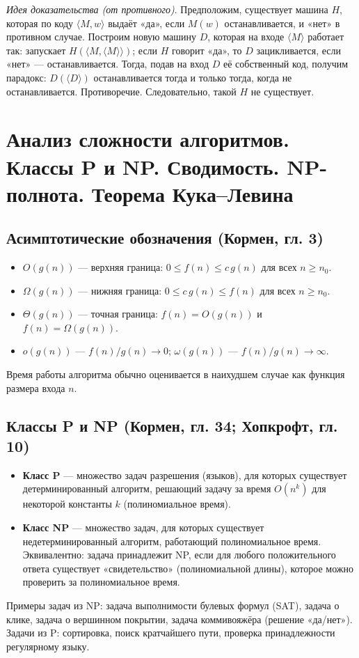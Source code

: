 \documentclass[a4paper,12pt]{article}
\begin{document}
\textit{Идея доказательства (от противного)}. Предположим, существует машина \( H \), которая по коду \( \langle M,w \rangle \) выдаёт «да», если \( M(w) \) останавливается, и «нет» в противном случае. Построим новую машину \( D \), которая на входе \( \langle M \rangle \) работает так: запускает \( H(\langle M, \langle M \rangle \rangle) \); если \( H \) говорит «да», то \( D \) зацикливается, если «нет» --- останавливается. Тогда, подав на вход \( D \) её собственный код, получим парадокс: \( D(\langle D \rangle) \) останавливается тогда и только тогда, когда не останавливается. Противоречие. Следовательно, такой \( H \) не существует.

\section{Анализ сложности алгоритмов. Классы P и NP. Сводимость. NP-полнота. Теорема Кука–Левина}

\subsection{Асимптотические обозначения (Кормен, гл. 3)}
\begin{itemize}
    \item \( O(g(n)) \) --- верхняя граница: \( 0\le f(n)\le c\,g(n) \) для всех \( n\ge n_0 \).
    \item \( \Omega(g(n)) \) --- нижняя граница: \( 0\le c\,g(n)\le f(n) \) для всех \( n\ge n_0 \).
    \item \( \Theta(g(n)) \) --- точная граница: \( f(n)=O(g(n)) \) и \( f(n)=\Omega(g(n)) \).
    \item \( o(g(n)) \) --- \( f(n)/g(n)\to 0 \); \( \omega(g(n)) \) --- \( f(n)/g(n)\to\infty \).
\end{itemize}
Время работы алгоритма обычно оценивается в наихудшем случае как функция размера входа \( n \).

\subsection{Классы P и NP (Кормен, гл. 34; Хопкрофт, гл. 10)}
\begin{itemize}
    \item \textbf{Класс P} --- множество задач разрешения (языков), для которых существует детерминированный алгоритм, решающий задачу за время \( O(n^k) \) для некоторой константы \( k \) (полиномиальное время).
    \item \textbf{Класс NP} --- множество задач, для которых существует недетерминированный алгоритм, работающий полиномиальное время. Эквивалентно: задача принадлежит NP, если для любого положительного ответа существует «свидетельство» (полиномиальной длины), которое можно проверить за полиномиальное время.
\end{itemize}
Примеры задач из NP: задача выполнимости булевых формул (SAT), задача о клике, задача о вершинном покрытии, задача коммивояжёра (решение «да/нет»). Задачи из P: сортировка, поиск кратчайшего пути, проверка принадлежности регулярному языку.
\end{document}

